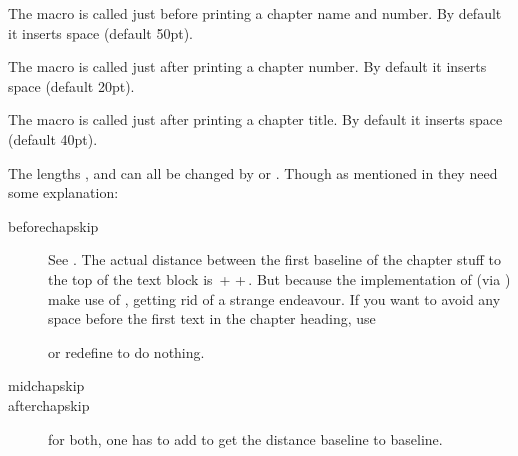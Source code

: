 The macro \cmd{\chapterheadstart} is called just before printing a chapter
name and number. By default it inserts \lnc{\beforechapskip} space (default
50pt).

The macro \cmd{\afterchapternum} is called just after printing a chapter
number. By default it inserts \lnc{\midchapskip} space (default
20pt).

The macro \cmd{\afterchaptertitle} is called just after printing a chapter
title. By default it inserts \lnc{\afterchapskip} space (default
40pt).

The lengths \lnc{\beforechapskip}, \lnc{\midchapskip} and \lnc{\afterchapskip}
can all be changed by \cmd{\setlength} or \cmd{\addtolength}. Though
as mentioned in  they need some explanation:
\begingroup
\medskip
\setlength\overfullrule{5pt}
\setlength\unitlength{\textwidth}
\addtolength{}
\renewcommand\descriptionlabel[1]{\hspace\labelsep\parbox{\unitlength}{\cs{#1}}}
\begin{description}
\item[beforechapskip] See .  The actual distance
  between the first baseline of the chapter stuff to the top of the
  text block is
  \cmd{\beforechapskip}\,+\,\cmd{\topskip}\,+\,\cmd{\baselineskip}.
  But because the implementation of \cmd{\chapter} (via
  \cmd{\chapterheadstart}) make use of \cmd{\vspace*}, getting rid of
  \cmd{\beforechapskip} a strange endeavour. If you want to avoid any
  space before the first text in the chapter heading, use
  \begin{lcode}
    \setlength\beforechapskip{-\baselineskip}
  \end{lcode}
  or redefine \cmd{\chapterheadstart} to do nothing.
\item[midchapskip]
\item[afterchapskip]
  for both, one has to add \cmd{\baselineskip} to
  get the distance baseline to baseline.
\end{description}
\endgroup





